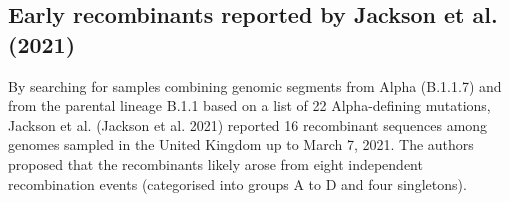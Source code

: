 \documentclass{article}
\begin{document}

\subsection{Early recombinants reported by Jackson et al. (2021)}

By searching for samples combining genomic segments from Alpha (B.1.1.7) and
from the parental lineage B.1.1 based on a list of 22 Alpha-defining mutations,
Jackson et al. (Jackson et al. 2021) reported 16 recombinant sequences among
genomes sampled in the United Kingdom up to March 7, 2021. The authors proposed
that the recombinants likely arose from eight independent recombination events
(categorised into groups A to D and four singletons).
\end{document}
